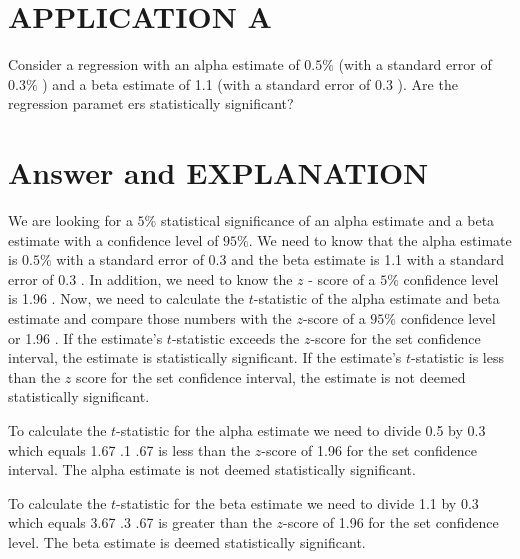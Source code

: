 \documentclass[11pt]{article}
\begin{document}
\section*{APPLICATION A}
Consider a regression with an alpha estimate of $0.5 \%$ (with a standard error of $0.3 \%$ ) and a beta estimate of 1.1 (with a standard error of 0.3 ). Are the regression paramet ers statistically significant?

\section*{Answer and EXPLANATION}
We are looking for a $5 \%$ statistical significance of an alpha estimate and a beta estimate with a confidence level of $95 \%$. We need to know that the alpha estimate is $0.5 \%$ with a standard error of 0.3 and the beta estimate is 1.1 with a standard error of 0.3 . In addition, we need to know the $z$ - score of a $5 \%$ confidence level is 1.96 . Now, we need to calculate the $t$-statistic of the alpha estimate and beta estimate and compare those numbers with the $z$-score of a $95 \%$ confidence level or 1.96 . If the estimate's $t$-statistic exceeds the $z$-score for the set confidence interval, the estimate is statistically significant. If the estimate's $t$-statistic is less than the $z$ score for the set confidence interval, the estimate is not deemed statistically significant.

To calculate the $t$-statistic for the alpha estimate we need to divide 0.5 by 0.3 which equals 1.67 .1 .67 is less than the $z$-score of 1.96 for the set confidence interval. The alpha estimate is not deemed statistically significant.

To calculate the $t$-statistic for the beta estimate we need to divide 1.1 by 0.3 which equals 3.67 .3 .67 is greater than the $z$-score of 1.96 for the set confidence level. The beta estimate is deemed statistically significant.
\end{document}
